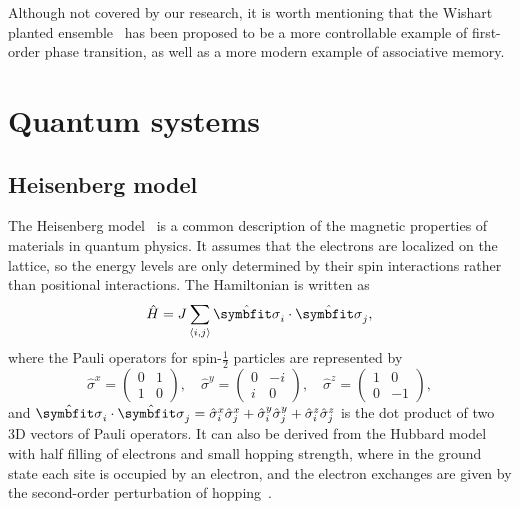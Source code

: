 Although not covered by our research, it is worth mentioning that the Wishart planted ensemble~\cite{hamze2020wishart, hibat2021variational} has been proposed to be a more controllable example of first-order phase transition, as well as a more modern example of associative memory.

\section{Quantum systems}
\label{sec:qu-sys}

\subsection{Heisenberg model}

The Heisenberg model~\cite{heisenberg1928theorie} is a common description of the magnetic properties of materials in quantum physics. It assumes that the electrons are localized on the lattice, so the energy levels are only determined by their spin interactions rather than positional interactions. The Hamiltonian is written as
\begin{equation}
\hat{H} = J \sum_{\langle i, j \rangle} \hat{\vsi}_i \cdot \hat{\vsi}_j,
\label{eq:heis}
\end{equation}
where the Pauli operators for spin-$\frac{1}{2}$ particles are represented by
\begin{equation}
\hat{\sigma}^x = \begin{pmatrix} 0 & 1 \\ 1 & 0 \end{pmatrix}, \quad
\hat{\sigma}^y = \begin{pmatrix} 0 & -i \\ i & 0 \end{pmatrix}, \quad
\hat{\sigma}^z = \begin{pmatrix} 1 & 0 \\ 0 & -1 \end{pmatrix},
\end{equation}
and $\hat{\vsi}_i \cdot \hat{\vsi}_j = \hat{\sigma}^x_i \hat{\sigma}^x_j + \hat{\sigma}^y_i \hat{\sigma}^y_j + \hat{\sigma}^z_i \hat{\sigma}^z_j$ is the dot product of two 3D vectors of Pauli operators. It can also be derived from the Hubbard model with half filling of electrons and small hopping strength, where in the ground state each site is occupied by an electron, and the electron exchanges are given by the second-order perturbation of hopping~\cite{cleveland1976obtaining}.

